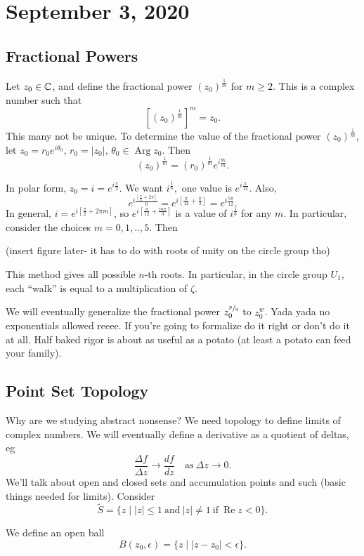 \section{September 3, 2020}
\subsection{Fractional Powers}
Let $z_0\in \mathbb{C}$, and define the fractional power $(z_0)^{\frac{1}{m}}$ for $m\geq 2$. This is a complex number such that 
\[
    \left[ (z_0)^{\frac{1}{m}} \right]^{m}=z_0.
\]
This many not be unique. To determine the value of the fractional power $(z_0)^{\frac{1}{m}}$, let $z_0=r_0e^{i\theta_0}, \, r_0=|z_0|, \, \theta_0\in \operatorname{Arg} z_0$. Then \[
    (z_0)^{\frac{1}{m}}=(r_0)^{\frac{1}{m}}e^{i\frac{\theta_0}{m}}.
\]
\begin{example}
   In polar form, $z_0=i=e^{i \frac{\pi}{2}}$. We want $i^{\frac{1}{6}},$ one value is $e^{i \frac{\pi}{12}}$. Also, 
   \[
   e^{i \frac{\left[ \frac{\pi}{2}+2\pi \right] }{6}}=e^{i\left[ \frac{\pi}{12}+\frac{\pi}{3} \right] }=e^{i \frac{5\pi}{12}}.
   \]
   In general, $i=e^{i \left[ \frac{\pi}{2}+2\pi m\right] }$, so $e^{i \left[ \frac{\pi}{12}+ \frac{m\pi}{3} \right] }$ is a value of $i^{\frac{1}{6}}$ for any $m$. In particular, consider the choices $m=0,1,..,5$. Then 

   (insert figure later- it has to do with roots of unity on the circle group tho)

   This method gives all possible $n$-th roots. In particular, in the circle group $U_1$, each ``walk'' is equal to a multiplication of $\zeta$.
\end{example}
We will eventually generalize the fractional power $z_0^{\sfrac{p}{q}}$ to $z_0^{w}$. Yada yada no exponentials allowed reeee. If you're going to formalize do it right or don't do it at all. Half baked rigor is about as useful as a potato (at least a potato can feed your family).

\subsection{Point Set Topology}
Why are we studying abstract nonsense? We need topology to define limits of complex numbers. We will eventually define a derivative as a quotient of deltas, eg \[
    \frac{\Delta f}{\Delta z} \to \frac{df}{dz} \quad \text{as} \ \Delta z \to 0.
\]
We'll talk about open and closed sets and accumulation points and such (basic things needed for limits). Consider \[
    \widetilde{S}= \{z  \mid |z| \leq 1 \ \text{and} \ |z| \neq 1 \ \text{if} \ \operatorname{Re} z < 0\}. 
\]
\begin{definition}
    We define an open ball \[
        B(z_0, \epsilon) = \{z \mid |z-z_0|<\epsilon\}.
    \]
\end{definition}

